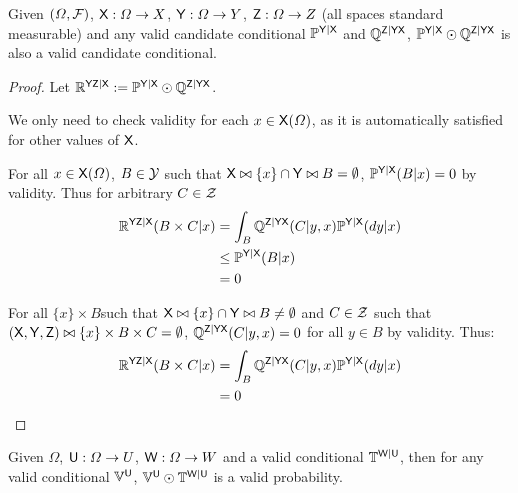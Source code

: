 \begin{lemma}\label{lem:valid_extendability}
Given $(\Omega,\mathcal{F})$, $\mathsf{X}:\Omega\to X$, $\mathsf{Y}:\Omega\to Y$, $\mathsf{Z}:\Omega\to Z$ (all spaces standard measurable) and any valid candidate conditional $\mathbb{P}^{\mathsf{Y}|\mathsf{X}}$ and $\mathbb{Q}^{\mathsf{Z}|\mathsf{Y}\mathsf{X}}$, $ \mathbb{P}^{\mathsf{Y}|\mathsf{X}}\odot \mathbb{Q}^{\mathsf{Z}|\mathsf{Y}\mathsf{X}}$ is also a valid candidate conditional.
\end{lemma}

\begin{proof}
Let $\mathbb{R}^{\mathsf{YZ}|\mathsf{X}}:=\mathbb{P}^{\mathsf{Y}|\mathsf{X}}\odot \mathbb{Q}^{\mathsf{Z}|\mathsf{Y}\mathsf{X}}$.

We only need to check validity for each $x\in \mathsf{X}(\Omega)$, as it is automatically satisfied for other values of $\mathsf{X}$.

For all $x\in \mathsf{X}(\Omega)$, $B\in \mathcal{Y}$ such that $\mathsf{X}\bowtie \{x\}\cap\mathsf{Y}\bowtie B=\emptyset$, $\mathbb{P}^{\mathsf{Y}|\mathsf{X}}(B|x)=0$ by validity. Thus for arbitrary $C\in \mathcal{Z}$
\begin{align}
    \mathbb{R}^{\mathsf{YZ}|\mathsf{X}}(B\times C|x) &= \int_B \mathbb{Q}^{\mathsf{Z}|\mathsf{YX}}(C|y,x)\mathbb{P}^{\mathsf{Y}|\mathsf{X}}(dy|x)\\
                                  &\leq \mathbb{P}^{\mathsf{Y}|\mathsf{X}}(B|x)\\
                                  &=0
\end{align}

For all $\{x\}\times B$such that $\mathsf{X}\bowtie \{x\}\cap\mathsf{Y}\bowtie B\neq \emptyset$ and $C\in \mathcal{Z}$ such that $(\mathsf{X},\mathsf{Y},\mathsf{Z})\bowtie \{x\}\times B\times C=\emptyset$, $\mathbb{Q}^{\mathsf{Z}|\mathsf{YX}}(C|y,x)=0$ for all $y\in B$ by validity. Thus:
\begin{align}
    \mathbb{R}^{\mathsf{YZ}|\mathsf{X}}(B\times C|x) &= \int_B \mathbb{Q}^{\mathsf{Z}|\mathsf{YX}}(C|y,x)\mathbb{P}^{\mathsf{Y}|\mathsf{X}}(dy|x)\\
                                            &=0
\end{align}
\end{proof}

\begin{corollary}\label{corr:valid_extend_order1}
Given $\Omega$, $\mathsf{U}:\Omega\to U$, $\mathsf{W}:\Omega\to W$ and a valid conditional $\mathbb{T}^{\mathsf{W}|\mathsf{U}}$, then for any valid conditional $\mathbb{V}^{\mathsf{U}}$, $\mathbb{V}^{\mathsf{U}}\odot \mathbb{T}^{\mathsf{W}|\mathsf{U}}$ is a valid probability.
\end{corollary}

